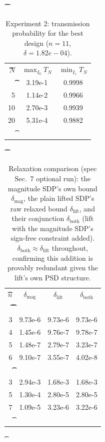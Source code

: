 \begin{table}[ht]
\t\centering
\t\begin{tabular}{r|cc}
\t\t$N$ & $\max_{I_0}T_N$ & $\min_{I_1}T_N$ \\
\t\t\hline
		1 & 3.19e-1 & 0.9998 \\
		5 & 1.14e-2 & 0.9966 \\
		10 & 2.70e-3 & 0.9939 \\
		20 & 5.31e-4 & 0.9882 \\
\t\end{tabular}
	\caption{Experiment 2: transmission probability for the best design ($n=11$, $\delta=1.82e-04$).}\label{tab:exp2-TN}
\end{table}

\begin{table}[ht]
\t\centering
\t\begin{tabular}{r|ccc}
\t\t$n$ & $\delta_{\mathrm{mag}}$ & $\delta_{\mathrm{lift}}$ & $\delta_{\mathrm{both}}$ \\
\t\t\hline
\t\t\multicolumn{4}{l}{experiment1} \\
		3 & 9.73e-6 & 9.73e-6 & 9.73e-6 \\
		4 & 1.45e-6 & 9.76e-7 & 9.78e-7 \\
		5 & 1.48e-7 & 2.79e-7 & 3.23e-7 \\
		6 & 9.10e-7 & 3.55e-7 & 4.02e-8 \\
\t\t\multicolumn{4}{l}{experiment2} \\
		3 & 2.94e-3 & 1.68e-3 & 1.68e-3 \\
		5 & 1.30e-4 & 2.80e-5 & 2.80e-5 \\
		7 & 1.09e-5 & 3.23e-6 & 3.22e-6 \\
\t\end{tabular}
\t\caption{Relaxation comparison (spec Sec.~7 optional run): the magnitude SDP's own bound $\delta_{\mathrm{mag}}$, the plain lifted SDP's raw relaxed bound $\delta_{\mathrm{lift}}$, and their conjunction $\delta_{\mathrm{both}}$ (lift with the magnitude SDP's sign-free constraint added). $\delta_{\mathrm{both}}\approx\delta_{\mathrm{lift}}$ throughout, confirming this addition is provably redundant given the lift's own PSD structure.}\label{tab:relaxation-comparison}
\end{table}